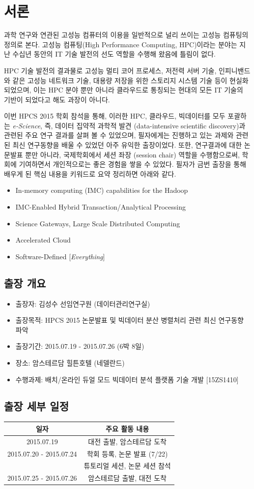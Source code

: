 \documentclass[twocolumn]{article}
\newcommand{\bi}{\begin{itemize}}
\newcommand{\ei}{\end{itemize}}
\newcommand{\ii}{\item}
\begin{document}
\section{서론}
과학 연구와 연관된 고성능 컴퓨터의 이용을 일반적으로 널리 쓰이는 고성능 컴퓨팅의 정의로 본다. 
고성능 컴퓨팅(High Performance Computing, HPC)이라는 분야는 지난 수십년 동안의 IT 기술 발전의 선도 역할을 수행해 왔음에 틀림이 없다. 

HPC 기술 발전의 결과물로 고성능 멀티 코어 프로세스, 저전력 서버 기술, 인피니밴드와 같은 고성능 네트워크 기술, 대용량 저장을 위한 스토리지 시스템 기술 등이 현실화되었으며, 이는 HPC 분야 뿐만 아니라 클라우드로 통칭되는 현대의 모든 IT 기술의 기반이 되었다고 해도 과장이 아니다.

이번 HPCS 2015 학회 \cite{hpcs:2015} 참석을 통해, 이러한 HPC, 클라우드, 빅데이터를 모두 포괄하는\textit{ e-Science}, 즉, 데이터 집약적 과학적 발견 (data-intensive scientific discovery)과 관련된 주요 연구 결과를 살펴 볼 수 있었으며, 필자에게는 진행하고 있는 과제와 관련된 최신 연구동향을 배울 수 있었던 아주 유익한 출장이었다. 
또한, 연구결과에 대한 논문발표 뿐만 아니라, 국제학회에서 세션 좌장 (session chair) 역할을 수행함으로써, 학회에 기여하면서 개인적으로는 좋은 경험을 쌓을 수 있었다.
필자가 금번 출장을 통해 배우게 된 핵심 내용을 키워드로 요약 정리하면 아래와 같다.

\bi
\ii In-memory computing (IMC) capabilities for the Hadoop
\ii IMC-Enabled Hybrid Transaction/Analytical Processing
\ii Science Gateways, Large Scale Distributed Computing
\ii Accelerated Cloud
\ii Software-Defined [\textit{Everything}]
\ei
\subsection{출장 개요}

\bi
\ii 출장자: 김성수 선임연구원 (데이터관리연구실)
\ii 출장목적: HPCS 2015 논문발표 및 빅데이터 분산 병렬처리 관련 최신 연구동향 파악
\ii 출장기간: 2015.07.19 - 2015.07.26 (6박 8일)
\ii 장소: 암스테르담 힐튼호텔 (네델란드)
\ii 수행과제: 배치/온라인 듀얼 모드 빅데이터 분석 플랫폼 기술 개발 [15ZS1410]
\ei

\subsection{출장 세부 일정}

\begin{tabular}{ c | c } 
\hline	
\textbf{일자} & \textbf{주요 활동 내용} \\ 
\hline 
\hline
2015.07.19 & 대전 출발, 암스테르담 도착 \\ 
2015.07.20 - 2015.07.24 & 학회 등록, 논문 발표 (7/22)  \\ 
 					 & 튜토리얼 세션, 논문 세션 참석 \\ 
2015.07.25 - 2015.07.26 & 암스테르담 출발, 대전 도착 \\
\hline 
\end{tabular}
\end{document}
